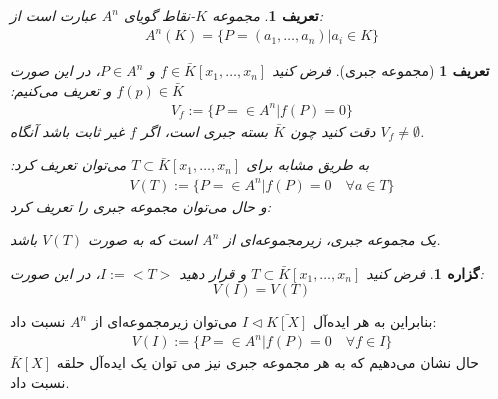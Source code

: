 \documentclass[12pt]{report}
\newtheorem{defn}[thm]{تعریف}
\newtheorem{prop}[thm]{گزاره}
\begin{document}
	\begin{defn}
		مجموعه $K$-نقاط گویای $A^n$
		 عبارت است از:
		\begin{equation*}
			\begin{aligned}
				A^n(K) = \{P=(a_1,\dots, a_n)| a_i \in K\}
			\end{aligned}
		\end{equation*}
	\end{defn}
	
	\begin{defn}[مجموعه جبری]
			فرض کنید 
		$f \in \bar{K}[x_1,\dots, x_n]$
			و 
		$P\in A^n$،
			در این صورت
		$f(p)\in \bar{K}$
			و تعریف می‌کنیم:
		\begin{equation*}
			\begin{aligned}
				V_f:=\{P=\in A^n| f(P)=0\}
			\end{aligned}
		\end{equation*}
			دقت کنید چون $\bar{K}$ بسته جبری است، اگر $f$ غیر ثابت باشد آنگاه 
			$V_f\neq \emptyset$.
			
			به طریق مشابه برای 
			$T \subset \bar{K}[x_1,\dots, x_n]$
				می‌توان تعریف کرد:
			\begin{equation*}
				\begin{aligned}
					V(T):=\{P=\in A^n| f(P)=0 \quad\forall a\in T\}
				\end{aligned}
			\end{equation*}
				و حال می‌توان مجموعه جبری را تعریف کرد:
				
				یک مجموعه جبری، زیرمجموعه‌ای از $A^n$ است که به صورت 
			$V(T)$
				باشد.
	\end{defn}
	
	\begin{prop}
		فرض کنید
			$T \subset \bar{K}[x_1,\dots, x_n]$
			و قرار دهید
			$I:=<T>$،
			در این صورت:
			$$V(I)=V(T)$$
	\end{prop}
	\newpage
	
	بنابراین به هر ایده‌آل 
	$I\lhd \bar{K[X]}$
	می‌توان زیرمجموعه‌ای از 
	 $A^n$
	نسبت داد:
	\begin{equation*}
		\begin{aligned}
			V(I):=\{P=\in A^n| f(P)=0 \quad \forall f\in I\}
		\end{aligned}
	\end{equation*}
	حال نشان می‌دهیم که به هر مجموعه جبری نیز می توان یک ایده‌آل حلقه 
	$\bar{K}[X]$ 
	نسبت داد.
	
\end{document}
